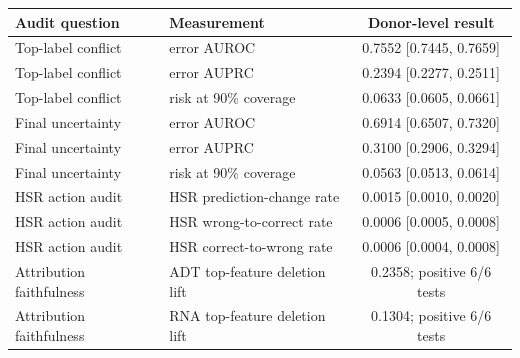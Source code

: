 \begin{tabular}{llc}
\toprule
Audit question & Measurement & Donor-level result \\
\midrule
Top-label conflict & error AUROC & 0.7552 [0.7445, 0.7659] \\
Top-label conflict & error AUPRC & 0.2394 [0.2277, 0.2511] \\
Top-label conflict & risk at 90\% coverage & 0.0633 [0.0605, 0.0661] \\
Final uncertainty & error AUROC & 0.6914 [0.6507, 0.7320] \\
Final uncertainty & error AUPRC & 0.3100 [0.2906, 0.3294] \\
Final uncertainty & risk at 90\% coverage & 0.0563 [0.0513, 0.0614] \\
HSR action audit & HSR prediction-change rate & 0.0015 [0.0010, 0.0020] \\
HSR action audit & HSR wrong-to-correct rate & 0.0006 [0.0005, 0.0008] \\
HSR action audit & HSR correct-to-wrong rate & 0.0006 [0.0004, 0.0008] \\
Attribution faithfulness & ADT top-feature deletion lift & 0.2358; positive 6/6 tests \\
Attribution faithfulness & RNA top-feature deletion lift & 0.1304; positive 6/6 tests \\
\bottomrule
\end{tabular}
